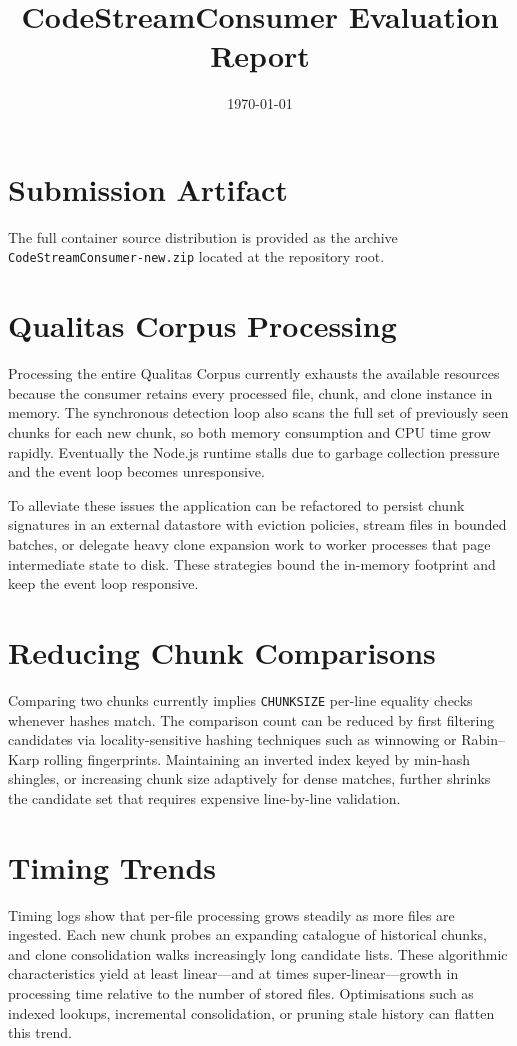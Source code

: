 \documentclass[11pt]{article}
\title{CodeStreamConsumer Evaluation Report}
\author{}
\date{\today}
\begin{document}
\maketitle

\section*{Submission Artifact}
The full container source distribution is provided as the archive \texttt{CodeStreamConsumer-new.zip} located at the repository root.

\section*{Qualitas Corpus Processing}
Processing the entire Qualitas Corpus currently exhausts the available resources because the consumer retains every processed file, chunk, and clone instance in memory. The synchronous detection loop also scans the full set of previously seen chunks for each new chunk, so both memory consumption and CPU time grow rapidly. Eventually the Node.js runtime stalls due to garbage collection pressure and the event loop becomes unresponsive.

To alleviate these issues the application can be refactored to persist chunk signatures in an external datastore with eviction policies, stream files in bounded batches, or delegate heavy clone expansion work to worker processes that page intermediate state to disk. These strategies bound the in-memory footprint and keep the event loop responsive.

\section*{Reducing Chunk Comparisons}
Comparing two chunks currently implies \texttt{CHUNKSIZE} per-line equality checks whenever hashes match. The comparison count can be reduced by first filtering candidates via locality-sensitive hashing techniques such as winnowing or Rabin--Karp rolling fingerprints. Maintaining an inverted index keyed by min-hash shingles, or increasing chunk size adaptively for dense matches, further shrinks the candidate set that requires expensive line-by-line validation.

\section*{Timing Trends}
Timing logs show that per-file processing grows steadily as more files are ingested. Each new chunk probes an expanding catalogue of historical chunks, and clone consolidation walks increasingly long candidate lists. These algorithmic characteristics yield at least linear---and at times super-linear---growth in processing time relative to the number of stored files. Optimisations such as indexed lookups, incremental consolidation, or pruning stale history can flatten this trend.
\end{document}
